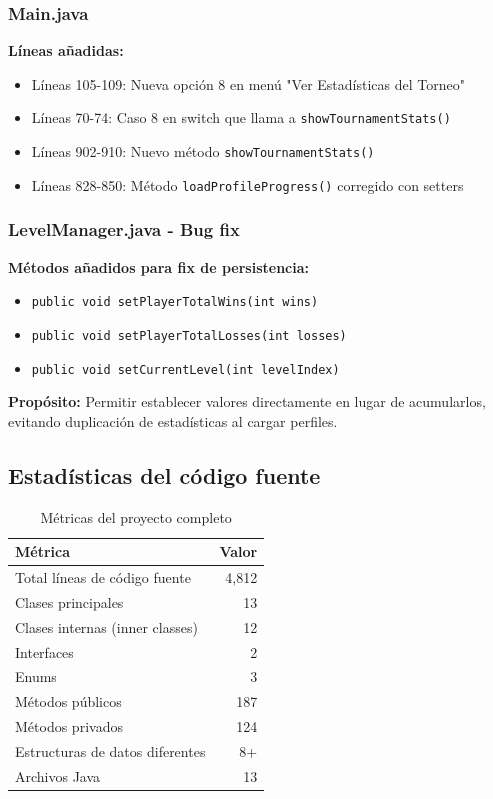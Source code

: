 \documentclass[12pt,a4paper]{article}
\begin{document}
\subsubsection{Main.java}

\textbf{Líneas añadidas:}
\begin{itemize}
    \item Líneas 105-109: Nueva opción 8 en menú "Ver Estadísticas del Torneo"
    \item Líneas 70-74: Caso 8 en switch que llama a \texttt{showTournamentStats()}
    \item Líneas 902-910: Nuevo método \texttt{showTournamentStats()}
    \item Líneas 828-850: Método \texttt{loadProfileProgress()} corregido con setters
\end{itemize}

\subsubsection{LevelManager.java - Bug fix}

\textbf{Métodos añadidos para fix de persistencia:}
\begin{itemize}
    \item \texttt{public void setPlayerTotalWins(int wins)}
    \item \texttt{public void setPlayerTotalLosses(int losses)}
    \item \texttt{public void setCurrentLevel(int levelIndex)}
\end{itemize}

\textbf{Propósito:} Permitir establecer valores directamente en lugar de acumularlos, evitando duplicación de estadísticas al cargar perfiles.

\subsection{Estadísticas del código fuente}

\begin{table}[H]
\centering
\begin{tabular}{|l|r|}
\hline
\textbf{Métrica} & \textbf{Valor} \\
\hline
Total líneas de código fuente & 4,812 \\
Clases principales & 13 \\
Clases internas (inner classes) & 12 \\
Interfaces & 2 \\
Enums & 3 \\
Métodos públicos & 187 \\
Métodos privados & 124 \\
Estructuras de datos diferentes & 8+ \\
Archivos Java & 13 \\
\hline
\end{tabular}
\caption{Métricas del proyecto completo}
\end{table}
\end{document}

